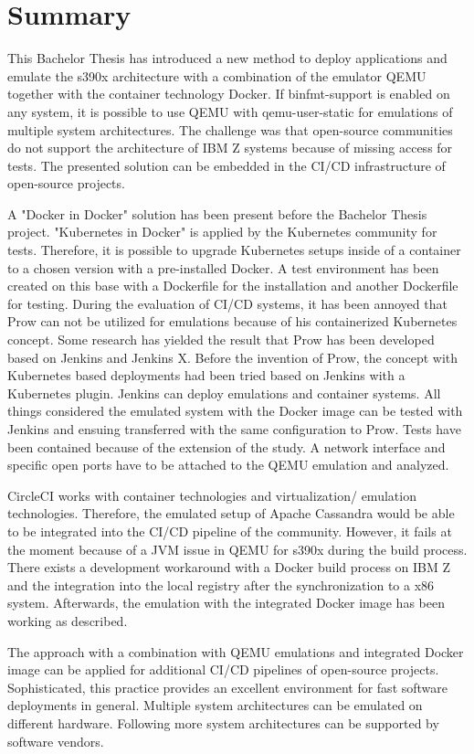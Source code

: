 \chapter{Summary}\label{ch:summary}

This Bachelor Thesis has introduced a new method to deploy applications and emulate the s390x architecture with a combination of the emulator QEMU together with the container technology Docker.
If binfmt-support is enabled on any system, it is possible to use QEMU with qemu-user-static for emulations of multiple system architectures. 
The challenge was that open-source communities do not support the architecture of IBM Z systems because of missing access for tests. The presented solution can be embedded in the CI/CD infrastructure of open-source projects. 

A "Docker in Docker" solution has been present before the Bachelor Thesis project. "Kubernetes in Docker" is applied by the Kubernetes community for tests. 
Therefore, it is possible to upgrade Kubernetes setups inside of a container to a chosen version with a pre-installed Docker. A test environment has been created on this base with a Dockerfile for the installation and another Dockerfile for testing. During the evaluation of CI/CD systems, it has been annoyed that Prow can not be utilized for emulations because of his containerized Kubernetes concept. 
Some research has yielded the result that Prow has been developed based on Jenkins and Jenkins X. Before the invention of Prow, the concept with Kubernetes based deployments had been  tried based on Jenkins with a Kubernetes plugin. Jenkins can deploy emulations and container systems. 
All things considered the emulated system with the Docker image can be tested with Jenkins and ensuing transferred with the same configuration to Prow.
Tests have been contained because of the extension of the study. A network interface and specific open ports have to be attached to the QEMU emulation and analyzed. 

CircleCI works with container technologies and virtualization/ emulation technologies. 
Therefore, the emulated setup of Apache Cassandra would be able to be integrated into the CI/CD pipeline of the community. However, it fails at the moment because of a JVM issue in QEMU for s390x during the build process. 
There exists a development workaround with a Docker build process on IBM Z and the integration into the local registry after the synchronization to a x86 system. Afterwards, the emulation with the integrated Docker image has been working as described.

The approach with a combination with QEMU emulations and integrated Docker image can be applied for additional CI/CD pipelines of open-source projects. Sophisticated, this practice provides an excellent environment for fast software deployments in general. 
Multiple system architectures can be emulated on different hardware. Following more system architectures can be supported by software vendors.